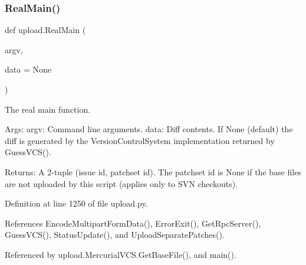 \subsubsection{\texorpdfstring{Real\+Main()}{RealMain()}}
{\footnotesize\ttfamily def upload.\+Real\+Main (\begin{DoxyParamCaption}\item[{}]{argv,  }\item[{}]{data = {\ttfamily None} }\end{DoxyParamCaption})}

\begin{DoxyVerb}The real main function.

Args:
  argv: Command line arguments.
  data: Diff contents. If None (default) the diff is generated by
    the VersionControlSystem implementation returned by GuessVCS().

Returns:
  A 2-tuple (issue id, patchset id).
  The patchset id is None if the base files are not uploaded by this
  script (applies only to SVN checkouts).
\end{DoxyVerb}
 

Definition at line 1250 of file upload.\+py.



References Encode\+Multipart\+Form\+Data(), Error\+Exit(), Get\+Rpc\+Server(), Guess\+V\+C\+S(), Status\+Update(), and Upload\+Separate\+Patches().



Referenced by upload.\+Mercurial\+V\+C\+S.\+Get\+Base\+File(), and main().


